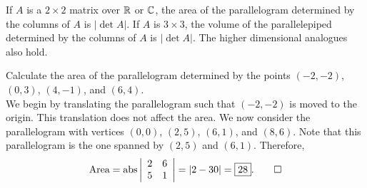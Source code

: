 \begin{multicols}{2}
\begin{Thm} If $A$ is a $2\times 2$ matrix over $\R$ or $\C$, the area of the parallelogram determined by the columns of $A$ is $|\det A|$. If $A$ is $3\times 3$, the volume of the parallelepiped determined by the columns of $A$ is $|\det A|$. The higher dimensional analogues also hold.
\end{Thm}
\begin{center}
\end{center}
\end{multicols}\vs

\begin{Exam} Calculate the area of the parallelogram determined by the points $(-2,-2)$, $(0,3)$, $(4,-1)$, and $(6,4)$.\\

We begin by translating the parallelogram such that $(-2,-2)$ is moved to the origin. This translation does not affect the area. We now consider the parallelogram with vertices $(0,0)$, $(2,5)$, $(6,1)$, and $(8,6)$. Note that this parallelogram is the one spanned by $(2,5)$ and $(6,1)$. Therefore, 
\[\text{Area} = \text{abs}\dtx{rr}{2&6\\5&1}= |2-30| = \fbox{$28$}.\qedhere\]
\end{Exam}\vs


